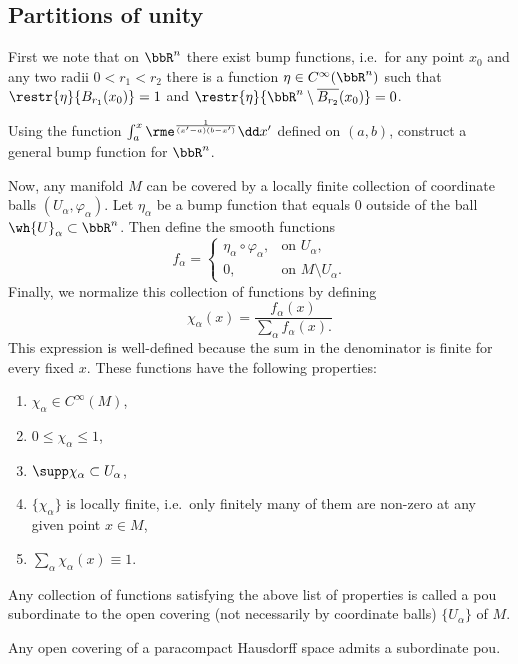 \subsection{Partitions of unity}

First we note that on $\bbR^n$ there exist bump functions, i.e.\ for any point $x_0$ and any two radii $0<r_1<r_2$ there is a function $\eta\in C^\infty(\bbR^n)$ such that $\restr{\eta}{B_{r_1}(x_0)}=1$ and $\restr{\eta}{\bbR^n\setminus \overline{B_{r_2}}(x_0)}=0$.
\begin{xca}
    Using the function $\int_a^x \rme^{\frac{1}{(x'-a)(b-x')}} \dd x'$ defined on $(a,b)$, construct a general bump function for $\bbR^n$.
\end{xca}

Now, any manifold $M$ can be covered by a locally finite collection of coordinate balls $(U_\alpha,\varphi_\alpha)$. Let $\eta_\alpha$ be a bump function that equals $0$ outside of the ball $\wh{U}_\alpha\subset \bbR^n$. Then define the smooth functions
\[f_\alpha =\begin{cases} \eta_\alpha\circ\varphi_\alpha, & \text{on }U_\alpha, \\ 0, & \text{on }M\setminus U_\alpha.\end{cases}\]
Finally, we normalize this collection of functions by defining
\[\chi_\alpha(x)=\frac{f_\alpha(x)}{\sum_\alpha f_\alpha (x).}\]
This expression is well-defined because the sum in the denominator is finite for every fixed $x$. These functions have the following properties:
\begin{enumerate}
    \item $\chi_\alpha\in C^\infty(M)$,
    \item $0\leq \chi_\alpha\leq 1$,
    \item $\supp \chi_\alpha\subset U_\alpha$,
    \item $\{\chi_\alpha\}$ is locally finite, i.e.\ only finitely many of them are non-zero at any given point $x\in M$,
    \item $\sum_\alpha \chi_\alpha (x)\equiv 1$.
\end{enumerate}

\begin{defn}
    Any collection of functions satisfying the above list of properties is called a \gls{pou} subordinate to the open covering (not necessarily by coordinate balls) $\{U_\alpha\}$ of $M$.
\end{defn}

\begin{prop}
    Any open covering of a paracompact Hausdorff space admits a subordinate \gls{pou}.
\end{prop}

